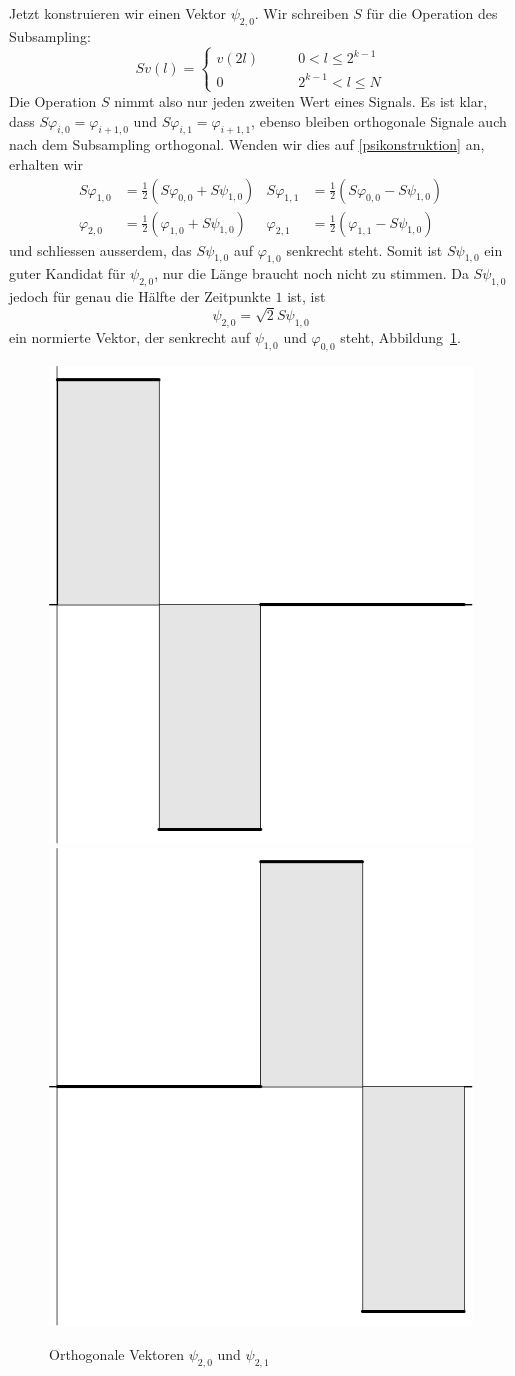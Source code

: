 Jetzt konstruieren wir einen Vektor $\psi_{2,0}$. Wir schreiben $S$
für die Operation des Subsampling:
\[
Sv(l)=\begin{cases}
v(2l)&\qquad 0 <l \le 2^{k-1}\\
0&\qquad 2^{k-1}<l\le N
\end{cases}
\]
Die Operation $S$ nimmt also nur jeden zweiten Wert eines Signals.
Es ist klar, dass $S\varphi_{i,0}=\varphi_{i+1,0}$ und
$S\varphi_{i,1}=\varphi_{i+1,1}$, ebenso bleiben orthogonale
Signale auch nach dem Subsampling orthogonal. Wenden wir dies
auf \ref{psikonstruktion} an, erhalten wir
\begin{align*}
S\varphi_{1,0}&=\frac12(S\varphi_{0,0}+S\psi_{1,0})
&
S\varphi_{1,1}&=\frac12(S\varphi_{0,0}-S\psi_{1,0})
\\
\varphi_{2,0}&=\frac12(\varphi_{1,0}+S\psi_{1,0})
&
\varphi_{2,1}&=\frac12(\varphi_{1,1}-S\psi_{1,0})
\end{align*}
und schliessen ausserdem, das $S\psi_{1,0}$ auf $\varphi_{1,0}$
senkrecht steht. Somit ist $S\psi_{1,0}$ ein guter Kandidat
für $\psi_{2,0}$, nur die Länge braucht noch nicht zu
stimmen. Da $S\psi_{1,0}$ jedoch für genau die Hälfte der Zeitpunkte
$1$ ist, ist
$$\psi_{2,0}=\sqrt{2}S\psi_{1,0}$$
ein normierte Vektor, der senkrecht auf $\psi_{1,0}$ und $\varphi_{0,0}$
steht, Abbildung~\ref{psi2}.
\begin{figure}
\begin{center}
\includegraphics[width=0.45\hsize]{images/w-9}
\includegraphics[width=0.45\hsize]{images/w-10}
\end{center}
\caption{Orthogonale Vektoren $\psi_{2,0}$ und $\psi_{2,1}$\label{psi2}}
\end{figure}

